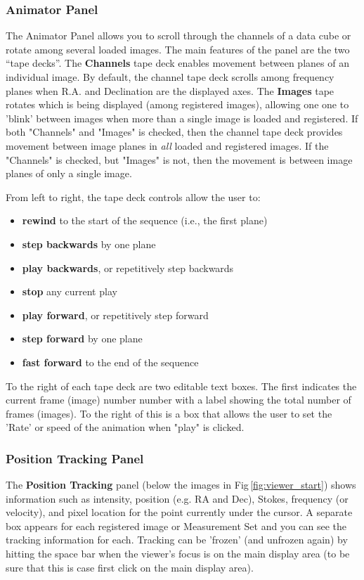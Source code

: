\subsubsection{Animator Panel}

The Animator Panel allows you to scroll through the channels of a data
cube or rotate among several loaded images. The main features of the
panel are the two ``tape decks''. The {\bf Channels} tape deck enables
movement between planes of an individual image. By default, the
channel tape deck scrolls among frequency planes when R.A. and
Declination are the displayed axes. The {\bf Images} tape rotates
which is being displayed (among registered images), allowing one one
to 'blink' between images when more than a single image is loaded and
registered. If both "Channels" and "Images" is checked, then the
channel tape deck provides movement between image planes in {\it all}
loaded and registered images.  If the "Channels" is checked, but
"Images" is not, then the movement is between image planes of only a
single image.


From left to right, the tape deck controls allow the user to:
\begin{itemize}
   \item {\bf rewind} to the start of the sequence (i.e., the first plane)
   \item {\bf step backwards} by one plane
   \item {\bf play backwards}, or repetitively step backwards
   \item {\bf stop} any current play
   \item {\bf play forward}, or repetitively step forward
   \item {\bf step forward} by one plane
   \item {\bf fast forward} to the end of the sequence
\end{itemize}

To the right of each tape deck are two editable text boxes. The first indicates the
current frame (image) number number with a label showing the total number of
frames (images). To the right of this is a box that allows the user to set 
the 'Rate' or speed of the animation when "play" is clicked.

\subsubsection{Position Tracking Panel}

The {\bf Position Tracking} panel (below the images in Fig\,\ref{fig:viewer_start})
shows information such as intensity, position (e.g. RA and Dec), Stokes, frequency 
(or velocity), and pixel location for the point currently under the cursor.  A separate box
appears for each registered image or Measurement Set and you can see the
tracking information for each.  Tracking can be 'frozen' (and unfrozen again)
by hitting the space bar when the viewer's focus is on the main display area 
(to be sure that this is case first click on the main display area).

